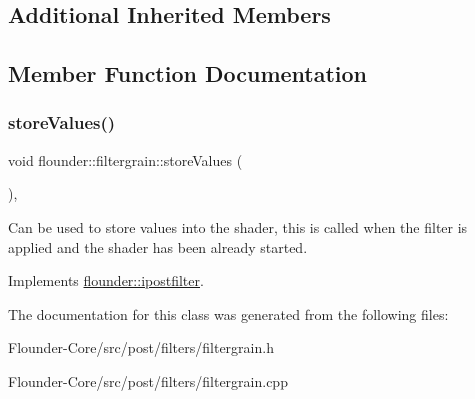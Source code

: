 \subsection*{Additional Inherited Members}


\subsection{Member Function Documentation}
\mbox{\label{classflounder_1_1filtergrain_a0f65f9e8b994f18a4777e4451bdf8b4e}} 
\subsubsection{\texorpdfstring{store\+Values()}{storeValues()}}
{\footnotesize\ttfamily void flounder\+::filtergrain\+::store\+Values (\begin{DoxyParamCaption}{ }\end{DoxyParamCaption})\hspace{0.3cm}{\ttfamily [override]}, {\ttfamily [virtual]}}



Can be used to store values into the shader, this is called when the filter is applied and the shader has been already started. 



Implements \hyperlink{classflounder_1_1ipostfilter_a9b658b4672718d5ac36539875bde722e}{flounder\+::ipostfilter}.



The documentation for this class was generated from the following files\+:\begin{DoxyCompactItemize}
\item 
Flounder-\/\+Core/src/post/filters/filtergrain.\+h\item 
Flounder-\/\+Core/src/post/filters/filtergrain.\+cpp\end{DoxyCompactItemize}
